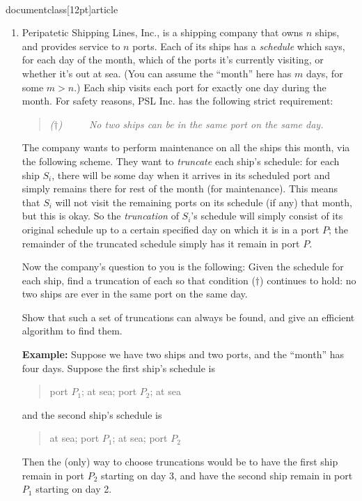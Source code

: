 \\documentclass[12pt]{article}
\begin{document}
\begin{enumerate}
{}


\item 

Peripatetic Shipping Lines, Inc., is a shipping
company that owns $n$ ships, and provides service to $n$ ports.
Each of its ships has a {\em schedule}
which says, for each day of the month,
which of the ports it's currently visiting, or whether it's out at sea.
(You can assume the ``month'' here has $m$ days, for some $m > n$.)
Each ship visits each port for exactly one day during the month.
For safety reasons, PSL Inc. has the following strict requirement:
\begin{quote}
{\em ($\dagger$) ~~~~ No two ships can be in the same port on the same day.}
\end{quote}

The company wants to perform maintenance on all the ships this
month, via the following scheme.
They want to {\em truncate} each ship's schedule:
for each ship $S_i$, there will be some day when it arrives
in its scheduled port and simply remains there for rest of
the month (for maintenance).
This means that $S_i$ will not visit the remaining ports
on its schedule (if any) that month, but this is okay.
So the {\em truncation} of $S_i$'s schedule will simply
consist of its original schedule up to a certain specified
day on which it is in a port $P$; the remainder of the
truncated schedule simply has it remain in port $P$.

Now the company's question to you is the following:
Given the schedule for each ship, find a truncation
of each so that condition ($\dagger$) continues to hold:
no two ships are ever in the same port on the same day.

Show that such a set of truncations can always be found,
and give an efficient algorithm to find them.

{\bf Example:} Suppose we have two ships and two ports,
and the ``month'' has four days.
Suppose the first ship's schedule is
\begin{quote}
port $P_1$; at sea; port $P_2$; at sea
\end{quote}
and the second ship's schedule is
\begin{quote}
at sea; port $P_1$; at sea; port $P_2$
\end{quote}
Then the (only) way to choose truncations would be
to have the first ship remain in port $P_2$ starting on day 3,
and have the second ship remain in port $P_1$ starting on day 2.


\end{enumerate}
\end{document}
